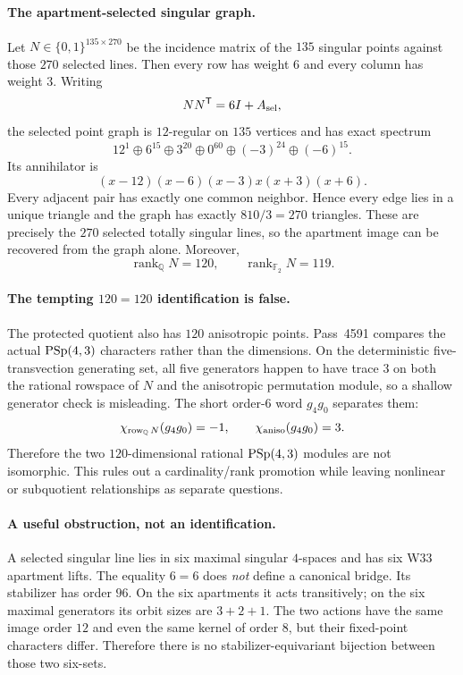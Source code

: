 \paragraph{The apartment-selected singular graph.}
Let $N\in\{0,1\}^{135\times270}$ be the incidence matrix of the $135$ singular
points against those $270$ selected lines.  Then every row has weight $6$ and
every column has weight $3$.  Writing
\[
  NN^{\mathsf T}=6I+A_{\rm sel},
\]
the selected point graph is $12$-regular on $135$ vertices and has exact spectrum
\[
  \boxed{12^1\oplus6^{15}\oplus3^{20}\oplus0^{60}\oplus(-3)^{24}\oplus(-6)^{15}}.
\]
Its annihilator is
\[
  (x-12)(x-6)(x-3)x(x+3)(x+6).
\]
Every adjacent pair has exactly one common neighbor.  Hence every edge lies in a
unique triangle and the graph has exactly $810/3=270$ triangles.  These are
precisely the $270$ selected totally singular lines, so the apartment image can be
recovered from the graph alone.  Moreover,
\[
  \operatorname{rank}_{\mathbb Q}N=120,
  \qquad
  \operatorname{rank}_{\mathbb F_2}N=119.
\]

\paragraph{The tempting $120=120$ identification is false.}
The protected quotient also has $120$ anisotropic points.  Pass~4591 compares the
actual $\mathrm{PSp}(4,3)$ characters rather than the dimensions.  On the deterministic
five-transvection generating set, all five generators happen to have trace $3$ on
both the rational rowspace of $N$ and the anisotropic permutation module, so a
shallow generator check is misleading.  The short order-$6$ word $g_4g_0$ separates
them:
\[
  \chi_{\operatorname{row}_{\mathbb Q}N}(g_4g_0)=-1,
  \qquad
  \chi_{\rm aniso}(g_4g_0)=3.
\]
Therefore the two $120$-dimensional rational $\mathrm{PSp}(4,3)$ modules are not
isomorphic.  This rules out a cardinality/rank promotion while leaving nonlinear
or subquotient relationships as separate questions.

\paragraph{A useful obstruction, not an identification.}
A selected singular line lies in six maximal singular $4$-spaces and has six W33
apartment lifts.  The equality $6=6$ does \emph{not} define a canonical bridge.
Its stabilizer has order $96$.  On the six apartments it acts transitively; on the
six maximal generators its orbit sizes are $3+2+1$.  The two actions have the same
image order $12$ and even the same kernel of order $8$, but their fixed-point
characters differ.  Therefore there is no stabilizer-equivariant bijection between
those two six-sets.

